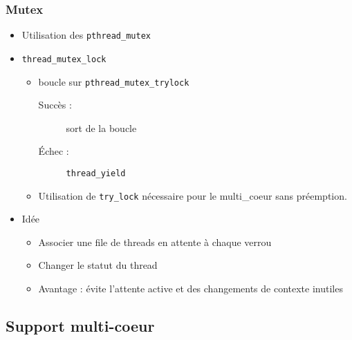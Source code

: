 \documentclass{beamer}
\begin{document}
\begin{frame}[containsverbatim]
  \frametitle{Mutex}
  \begin{itemize}
    \item Utilisation des \verb!pthread_mutex!
    \item \verb!thread_mutex_lock!
      \begin{itemize}
        \item boucle sur \verb!pthread_mutex_trylock!
          \begin{description}
          \item[Succès :] sort de la boucle
          \item[Échec :]  \verb!thread_yield!
          \end{description}
        \item Utilisation de \verb!try_lock! nécessaire pour le
          multi\_coeur sans préemption.
      \end{itemize}
      \item Idée
        \begin{itemize}
        \item Associer une file de threads en attente à chaque verrou
        \item Changer le statut du thread
        \item Avantage : évite l'attente active et des changements de
          contexte inutiles
        \end{itemize}
  \end{itemize}
\end{frame}

\subsection{Support multi-coeur}
\end{document}

